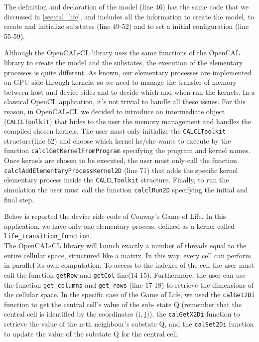 The definition and declaration of the model (line 46) has the same code
that we discussed in \ref{sec:cal_life}, and includes all the information
to create the model, to create and initialize substates (line 49-52) and 
to set a initial configuration (line 55-59).


	
Although the OpenCAL-CL library uses the same functions of the OpenCAL
library to create the model and the substates, the execution of the
elementary processes is quite different. As known, our elementary
processes are implemented on GPU side through kernels, so we need to manage the
transfer of memory between host and device sides and to decide which and
when run the kernels. In a classical OpenCL application, it's not
trivial to handle all these issues. For this reason,
in OpenCAL-CL we decided to introduce an intermediate object
(\verb'CALCLToolkit') that hides to the user the memory management and handles the
compiled chosen kernels. The user must only initialize the
\verb'CALCLToolkit' structure(line 62) and choose which kernel he/she
wants to execute by the function \verb'calclGetKernelFromProgram'
specifying the program and kernel names. Once kernels are chosen to be executed,
the user must only call the function
\verb'calclAddElementaryProcessKernel2D' (line 71) that adds the
specific kernel elementary process inside the \verb'CALCLToolkit'
structure. Finally, to run the simulation the user must call the function
\verb'calclRun2D' specifying the initial and final step.

Below is reported the device side code of Conway's Game of
Life.  In this application, we have only one elementary process, defined as a kernel called
\verb'life_transition_function'.\\ The OpenCAL-CL library will launch
exactly a number of threads equal to the entire cellular space,
structured like a matrix. In this way, every cell can perform in parallel
its own computation. To access to the indexes of the cell the user
must call the function \verb'getRow' and \verb'getCol'
line(14-15). Furthermore, the user can use the function
\verb'get_columns' and \verb'get_rows' (line 17-18) to retrieve the
dimensions of the cellular space.  In the specific case of the Game of
Life, we used the \verb'calGet2Di' function to get the central cell’s value of the sub-
state Q (remember that the central cell is identified by the coordinates (i, j)), the \verb'calGetX2Di' function to retrieve the value
of the n-th neighbour’s substate Q, and the \verb'calSet2Di' function to update the
value of the substate Q for the central cell. 



 